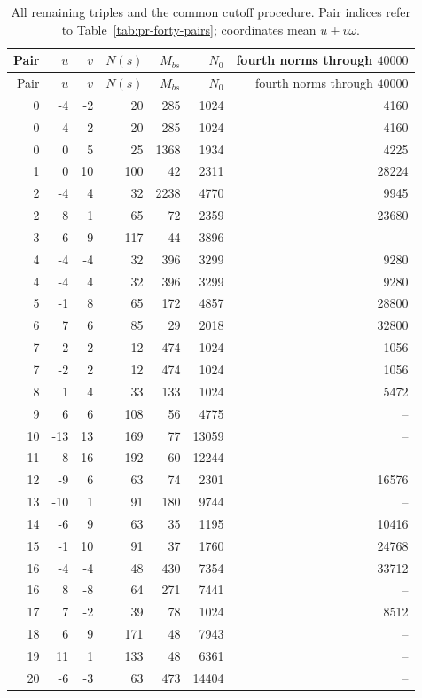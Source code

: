 \documentclass[12pt]{article}
\numberwithin{equation}{section}
\begin{document}
\begin{longtable}{r|r r|r|r|r|r}
\caption{All remaining triples and the common cutoff procedure. Pair indices refer to Table~\ref{tab:pr-forty-pairs}; coordinates mean $u+v\omega$.}\label{tab:fixed56}\\
Pair&$u$&$v$&$N(s)$&$M_{bs}$&$N_0$&fourth norms through $40000$\\\hline
\endfirsthead
Pair&$u$&$v$&$N(s)$&$M_{bs}$&$N_0$&fourth norms through $40000$\\\hline
\endhead
0 & -4 & -2 & 20 & 285 & 1024 & 4160 \\
0 & 4 & -2 & 20 & 285 & 1024 & 4160 \\
0 & 0 & 5 & 25 & 1368 & 1934 & 4225 \\
1 & 0 & 10 & 100 & 42 & 2311 & 28224 \\
2 & -4 & 4 & 32 & 2238 & 4770 & 9945 \\
2 & 8 & 1 & 65 & 72 & 2359 & 23680 \\
3 & 6 & 9 & 117 & 44 & 3896 & -- \\
4 & -4 & -4 & 32 & 396 & 3299 & 9280 \\
4 & -4 & 4 & 32 & 396 & 3299 & 9280 \\
5 & -1 & 8 & 65 & 172 & 4857 & 28800 \\
6 & 7 & 6 & 85 & 29 & 2018 & 32800 \\
7 & -2 & -2 & 12 & 474 & 1024 & 1056 \\
7 & -2 & 2 & 12 & 474 & 1024 & 1056 \\
8 & 1 & 4 & 33 & 133 & 1024 & 5472 \\
9 & 6 & 6 & 108 & 56 & 4775 & -- \\
10 & -13 & 13 & 169 & 77 & 13059 & -- \\
11 & -8 & 16 & 192 & 60 & 12244 & -- \\
12 & -9 & 6 & 63 & 74 & 2301 & 16576 \\
13 & -10 & 1 & 91 & 180 & 9744 & -- \\
14 & -6 & 9 & 63 & 35 & 1195 & 10416 \\
15 & -1 & 10 & 91 & 37 & 1760 & 24768 \\
16 & -4 & -4 & 48 & 430 & 7354 & 33712 \\
16 & 8 & -8 & 64 & 271 & 7441 & -- \\
17 & 7 & -2 & 39 & 78 & 1024 & 8512 \\
18 & 6 & 9 & 171 & 48 & 7943 & -- \\
19 & 11 & 1 & 133 & 48 & 6361 & -- \\
20 & -6 & -3 & 63 & 473 & 14404 & -- \\

\end{longtable}
\end{document}

